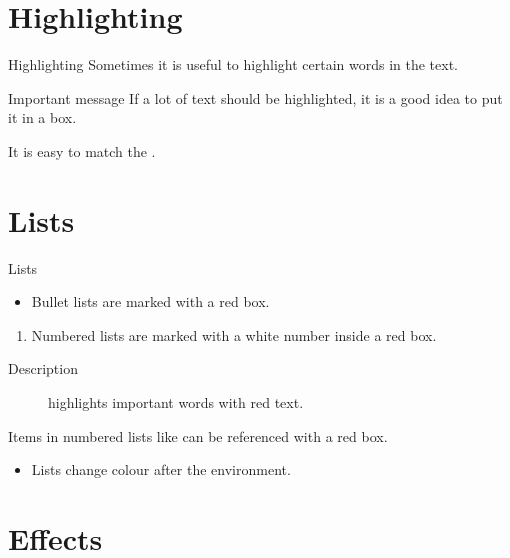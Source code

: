 \documentclass[UKenglish]{beamer}
\begin{document}
\section{Highlighting}
\SectionPage


\begin{frame}{Highlighting}
    Sometimes it is useful to \alert{highlight} certain words in the text.

    \begin{alertblock}{Important message}
        If a lot of text should be \alert{highlighted}, it is a good idea to put it in a box.
    \end{alertblock}

    It is easy to match the .
\end{frame}


\section{Lists}


\begin{frame}{Lists}
    \begin{itemize}
        \item
        Bullet lists are marked with a red box.
    \end{itemize}

    \begin{enumerate}
        \item
        \label{enum:item}
        Numbered lists are marked with a white number inside a red box.
    \end{enumerate}

    \begin{description}
        \item[Description] highlights important words with red text.
    \end{description}

    Items in numbered lists like  can be referenced with a red box.

    \begin{example}
        \begin{itemize}
            \item
            Lists change colour after the environment.
        \end{itemize}
    \end{example}
\end{frame}


\section{Effects}
\end{document}
